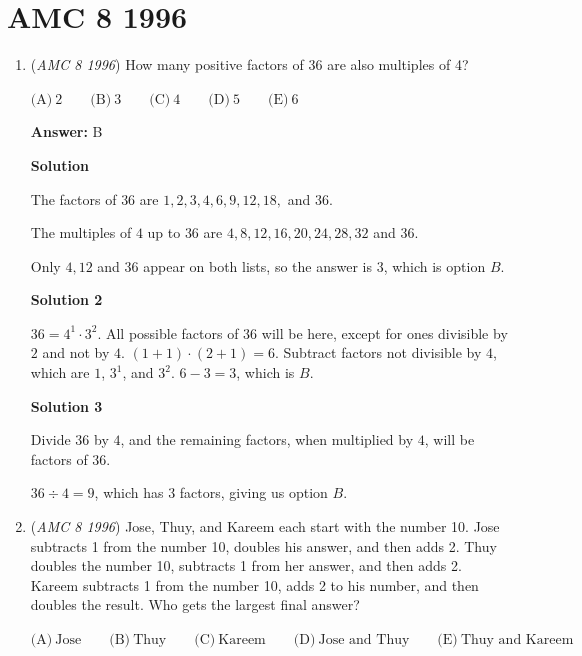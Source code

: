 \section{AMC 8 1996}
        \begin{enumerate}
        	\item (\textit{AMC 8 1996}) How many positive factors of 36 are also multiples of 4?


 $\text{(A)}\ 2 \qquad \text{(B)}\ 3 \qquad \text{(C)}\ 4 \qquad \text{(D)}\ 5 \qquad \text{(E)}\ 6$

 \textbf{Answer: }B



\textbf{Solution}

The factors of $36$ are $1, 2, 3, 4, 6, 9, 12, 18,$ and $36$.

 The multiples of $4$ up to $36$ are $4, 8, 12, 16, 20, 24, 28, 32$ and $36$.

 Only $4, 12$ and $36$ appear on both lists, so the answer is $3$, which is option $\boxed{B}$.

 



\textbf{Solution 2}

$36 = 4^1 \cdot 3^2$. All possible factors of $36$ will be here, except for ones divisible by $2$ and not by $4$. $(1+1)\cdot (2+1) = 6$. Subtract factors not divisible by $4$, which are $1$, $3^1$, and $3^2$. $6-3=3$, which is $\boxed{B}$.

 



\textbf{Solution 3}

Divide $36$ by $4$, and the remaining factors, when multiplied by $4$, will be factors of $36$.

 $36 \div 4 = 9$, which has $3$ factors, giving us option $\boxed{B}$.

 


	\item (\textit{AMC 8 1996}) Jose, Thuy, and Kareem each start with the number 10.  Jose subtracts 1 from the number 10, doubles his answer, and then adds 2.  Thuy doubles the number 10, subtracts 1 from her answer, and then adds 2.  Kareem subtracts 1 from the number 10, adds 2 to his number, and then doubles the result.  Who gets the largest final answer?


 $\text{(A)}\ \text{Jose} \qquad \text{(B)}\ \text{Thuy} \qquad \text{(C)}\ \text{Kareem} \qquad \text{(D)}\ \text{Jose and Thuy} \qquad \text{(E)}\ \text{Thuy and Kareem}$


\end{enumerate}
